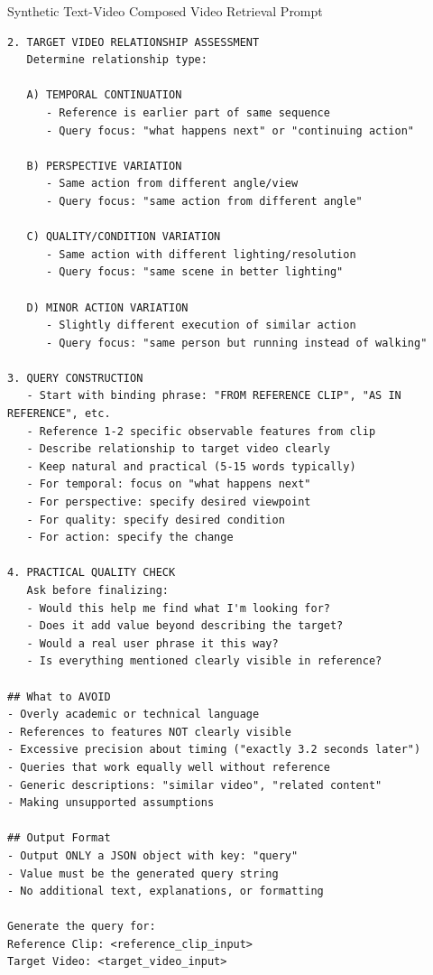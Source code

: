 \begin{promptbox}{Synthetic Text-Video Composed Video Retrieval Prompt}
\begin{lstlisting}[style=promptstyle]
2. TARGET VIDEO RELATIONSHIP ASSESSMENT
   Determine relationship type:

   A) TEMPORAL CONTINUATION
      - Reference is earlier part of same sequence
      - Query focus: "what happens next" or "continuing action"

   B) PERSPECTIVE VARIATION
      - Same action from different angle/view
      - Query focus: "same action from different angle"

   C) QUALITY/CONDITION VARIATION
      - Same action with different lighting/resolution
      - Query focus: "same scene in better lighting"

   D) MINOR ACTION VARIATION
      - Slightly different execution of similar action
      - Query focus: "same person but running instead of walking"

3. QUERY CONSTRUCTION
   - Start with binding phrase: "FROM REFERENCE CLIP", "AS IN REFERENCE", etc.
   - Reference 1-2 specific observable features from clip
   - Describe relationship to target video clearly
   - Keep natural and practical (5-15 words typically)
   - For temporal: focus on "what happens next"
   - For perspective: specify desired viewpoint
   - For quality: specify desired condition
   - For action: specify the change

4. PRACTICAL QUALITY CHECK
   Ask before finalizing:
   - Would this help me find what I'm looking for?
   - Does it add value beyond describing the target?
   - Would a real user phrase it this way?
   - Is everything mentioned clearly visible in reference?

## What to AVOID
- Overly academic or technical language
- References to features NOT clearly visible
- Excessive precision about timing ("exactly 3.2 seconds later")
- Queries that work equally well without reference
- Generic descriptions: "similar video", "related content"
- Making unsupported assumptions

## Output Format
- Output ONLY a JSON object with key: "query"
- Value must be the generated query string
- No additional text, explanations, or formatting

Generate the query for:
Reference Clip: <reference_clip_input>
Target Video: <target_video_input>
\end{lstlisting}
\end{promptbox}

